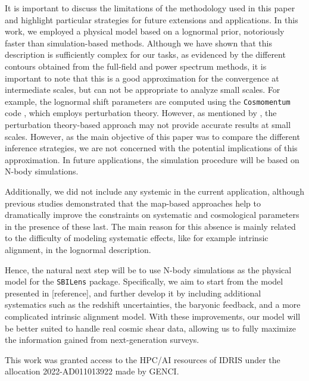 \documentclass{aa}
\begin{document}
It is important to discuss the limitations of the methodology used in this paper and highlight particular strategies for future extensions and applications. In this work, we employed a physical model based on a lognormal prior, notoriously faster than simulation-based methods. Although we have shown that this description is sufficiently complex for our tasks, as evidenced by the different contours obtained from the full-field and power spectrum methods, it is important to note that this is a good approximation for the convergence at intermediate scales, but can not be appropriate to analyze small scales. 
For example, the lognormal shift parameters are computed using the \texttt{Cosmomentum} code \citep{friedrich2018density, friedrich2020primordial}, which employs perturbation theory. However, as mentioned by \citet{boruah2022map}, the perturbation theory-based approach may not provide accurate results at small scales.
However, as the main objective of this paper was to compare the different inference strategies, we are not concerned with the potential implications of this approximation. In future applications, the simulation procedure will be based on N-body simulations.

Additionally, we did not include any systemic in the current application, although previous studies demonstrated that the map-based approaches help to dramatically improve the constraints on systematic and cosmological parameters in the presence of these last. The main reason for this absence is mainly related to the difficulty of modeling systematic effects, like for example intrinsic alignment, in the lognormal description. 

Hence, the natural next step will be to use N-body simulations as the physical model for the  \texttt{SBILens} package. Specifically, we aim to start from the model presented in [reference], and further develop it by including additional systematics such as the redshift uncertainties, the baryonic feedback, and a more complicated intrinsic alignment model. 
With these improvements, our model will be better suited to handle real cosmic shear data, allowing us to fully maximize the information gained from next-generation surveys.
 
\begin{acknowledgements}
This work was granted access to the HPC/AI resources of IDRIS under the allocation 2022-AD011013922 made by GENCI.
\end{acknowledgements}
 
\end{document}
